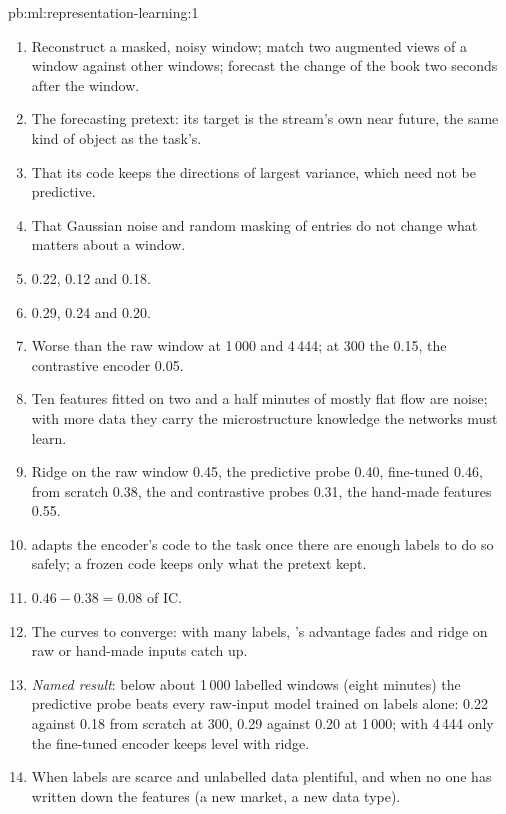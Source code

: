 \begin{solution}{pb:ml:representation-learning:1}
\begin{enumerate}
\item Reconstruct a masked, noisy window; match two augmented views of a window against other windows; forecast the change
of the book two seconds after the window.
\item The forecasting pretext: its target is the stream's own near future, the same kind of object as the task's.
\item That its code keeps the directions of largest variance, which need not be predictive.
\item That Gaussian noise and random masking of entries do not change what matters about a window.
\item 0.22, 0.12 and 0.18.
\item 0.29, 0.24 and 0.20.
\item Worse than the raw window at 1\,000 and 4\,444; at 300 the  0.15, the contrastive encoder 0.05.
\item Ten features fitted on two and a half minutes of mostly flat flow are noise; with more data they carry the
microstructure knowledge the networks must learn.
\item Ridge on the raw window 0.45, the predictive probe 0.40, fine-tuned 0.46, from scratch 0.38, the  and
contrastive probes 0.31, the hand-made features 0.55.
\item {} adapts the encoder's code to the task once there are enough labels to do so safely; a frozen code keeps
only what the pretext kept.
\item $0.46 - 0.38 = 0.08$ of IC.
\item The curves to converge: with many labels, 's advantage fades and ridge on raw or hand-made inputs catch
up.
\item \emph{Named result}: below about 1\,000 labelled windows (eight minutes) the predictive probe beats every raw-input
model trained on labels alone: 0.22 against 0.18 from scratch at 300, 0.29 against 0.20 at 1\,000; with 4\,444 only the
fine-tuned encoder keeps level with ridge.
\item When labels are scarce and unlabelled data plentiful, and when no one has written down the features (a new market,
a new data type).

\end{enumerate}
\end{solution}
